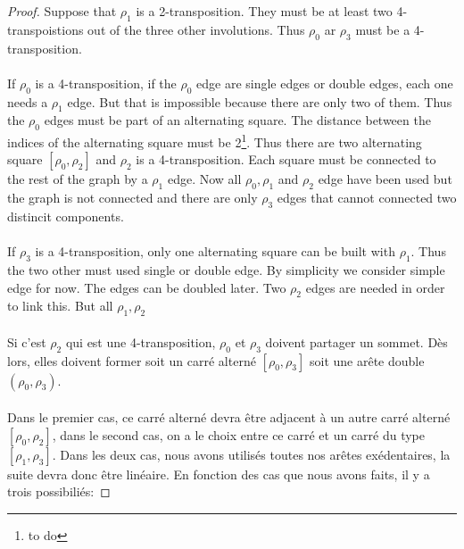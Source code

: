 \begin{proof}
  Suppose that $\rho_1$ is a 2-transposition. They must be at least two 4-transpoistions out of the three other involutions. Thus $\rho_0$ ar $\rho_3$ must be a 4-transposition.

  \paragraph{}
  If $\rho_0$ is a 4-transposition, if the $\rho_0$ edge are single edges or double edges, each one needs a $\rho_1$ edge. But that is impossible because there are only two of them. Thus the $\rho_0$ edges must be part of an alternating square. The distance between the indices of the alternating square must be 2\footnote{to do}. Thus there are two alternating square $[\rho_0, \rho_2]$ and $\rho_2$ is a 4-transposition. Each square must be connected to the rest of the graph by a $\rho_1$ edge. Now all $\rho_0, \rho_1$ and $\rho_2$ edge have been used but the graph is not connected and there are only $\rho_3$ edges that cannot connected two distincit components.

  \paragraph{}
  If $\rho_3$ is a 4-transposition, only one alternating square can be built with $\rho_1$. Thus the two other must used single or double edge. By simplicity we consider simple edge for now. The edges can be doubled later. Two $\rho_2$ edges are needed in order to link this. But all $\rho_1, \rho_2$

  \paragraph{}
  Si c'est $\rho_2$ qui est une 4-transposition, $\rho_0$ et $\rho_3$ doivent partager un sommet. Dès lors, elles doivent former soit un carré alterné $[\rho_0, \rho_3]$ soit une arête double $(\rho_0, \rho_3)$.

  \paragraph{}
  Dans le premier cas, ce carré alterné devra être adjacent à un autre carré alterné $[\rho_0, \rho_2]$, dans le second cas, on a le choix entre ce carré et un carré du type $[\rho_1, \rho_3]$. Dans les deux cas, nous avons utilisés toutes nos arêtes exédentaires, la suite devra donc être linéaire. En fonction des cas que nous avons faits, il y a trois possibiliés:


\end{proof}

